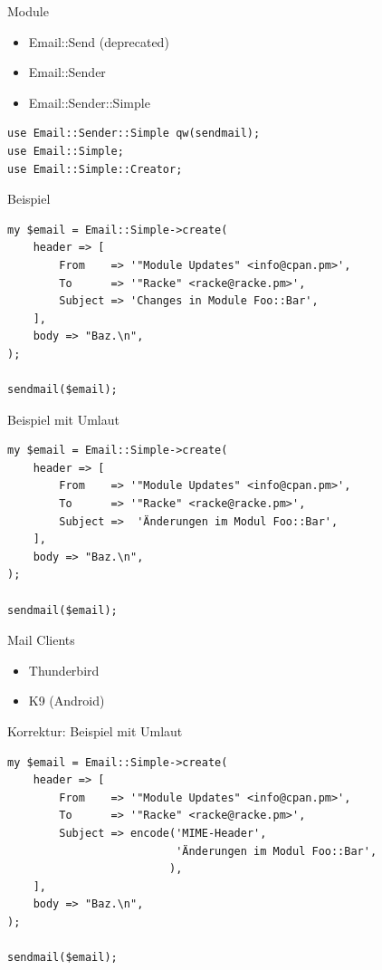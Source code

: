 \begin{frame}{Module}
  \begin{itemize}
  \item Email::Send (deprecated)
  \item Email::Sender
  \item Email::Sender::Simple
  \end{itemize}
\end{frame}

\begin{lstlisting}
use Email::Sender::Simple qw(sendmail);
use Email::Simple;
use Email::Simple::Creator;
\end{lstlisting}

\begin{frame}[fragile]{Beispiel}
  \begin{lstlisting}
my $email = Email::Simple->create(
    header => [
        From    => '"Module Updates" <info@cpan.pm>',
        To      => '"Racke" <racke@racke.pm>',
        Subject => 'Changes in Module Foo::Bar',
    ],
    body => "Baz.\n",
);

sendmail($email);
  \end{lstlisting}
\end{frame}

\begin{frame}[fragile]{Beispiel mit Umlaut}
  \begin{lstlisting}
my $email = Email::Simple->create(
    header => [
        From    => '"Module Updates" <info@cpan.pm>',
        To      => '"Racke" <racke@racke.pm>',
        Subject =>  'Änderungen im Modul Foo::Bar',
    ],
    body => "Baz.\n",
);

sendmail($email);
  \end{lstlisting}
\end{frame}

\begin{frame}[fragile]{Mail Clients}

  \begin{itemize}
  \item[\goodsmile] Thunderbird
  \item[\sadsmile] K9 (Android)
  \end{itemize}

\end{frame}

\begin{frame}[fragile]{Korrektur: Beispiel mit Umlaut}
  \begin{lstlisting}
my $email = Email::Simple->create(
    header => [
        From    => '"Module Updates" <info@cpan.pm>',
        To      => '"Racke" <racke@racke.pm>',
        Subject => encode('MIME-Header', 
                          'Änderungen im Modul Foo::Bar',
                         ),
    ],
    body => "Baz.\n",
);

sendmail($email);
  \end{lstlisting}
\end{frame}

